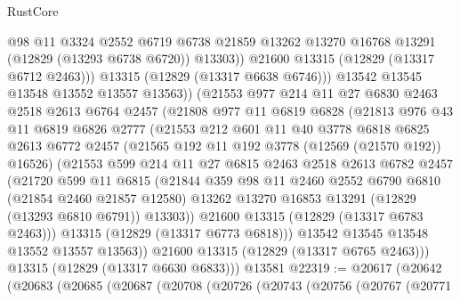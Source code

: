 \begin{lexlean}{RustCore}
\begin{coremodule}
                  @98
                  @11
                  @3324
                  @2552
                  @6719
                  @6738
                  @21859
                  @13262
                  @13270
                  @16768
                  @13291
                  (@12829 (@13293 @6738 @6720))
                  @13303))
              @21600
              @13315
              (@12829 (@13317 @6712 @2463)))
            @13315
            (@12829 (@13317 @6638 @6746)))
          @13542
          @13545
          @13548
          @13552
          @13557
          @13563))
      (@21553
        @977
        @214
        @11
        @27
        @6830
        @2463
        @2518
        @2613
        @6764
        @2457
        (@21808
          @977
          @11
          @6819
          @6828
          (@21813
            @976
            @43
            @11
            @6819
            @6826
            @2777
            (@21553
              @212
              @601
              @11
              @40
              @3778
              @6818
              @6825
              @2613
              @6772
              @2457
              (@21565 @192 @11 @192 @3778 (@12569 (@21570 @192)) @16526)
              (@21553
                @599
                @214
                @11
                @27
                @6815
                @2463
                @2518
                @2613
                @6782
                @2457
                (@21720
                  @599
                  @11
                  @6815
                  (@21844
                    @359
                    @98
                    @11
                    @2460
                    @2552
                    @6790
                    @6810
                    (@21854 @2460 @21857 @12580)
                    @13262
                    @13270
                    @16853
                    @13291
                    (@12829 (@13293 @6810 @6791))
                    @13303))
                @21600
                @13315
                (@12829 (@13317 @6783 @2463)))
              @13315
              (@12829 (@13317 @6773 @6818)))
            @13542
            @13545
            @13548
            @13552
            @13557
            @13563))
        @21600
        @13315
        (@12829 (@13317 @6765 @2463)))
      @13315
      (@12829 (@13317 @6630 @6833)))
    @13581
@22319 := @20617
    (@20642
      (@20683
        (@20685
          (@20687
            (@20708
              (@20726
                (@20743
                  (@20756
                    (@20767
                      (@20771

\end{coremodule}
\end{lexlean}
